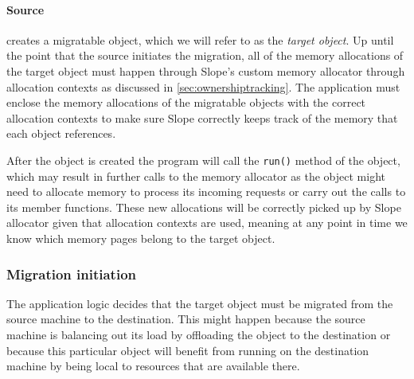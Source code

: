\paragraph{Source}
creates a migratable object, which we will refer to as the \emph{target object}.
Up until the point that
the source initiates the migration, all of the memory allocations of the target object
must happen through
Slope's custom memory allocator through allocation contexts as discussed in
\autoref{sec:ownershiptracking}.
The application must enclose the memory allocations of the migratable objects
with the correct allocation contexts to make sure Slope correctly keeps track of the
memory that each object references.



After the object is created the program will call the \texttt{run()} method
of the object, which may result in further calls to the memory allocator as
the object might need to allocate memory to process its incoming requests or
carry out the calls to its member functions. These new allocations will be
correctly picked up by Slope allocator given that allocation contexts are used,
meaning at any point in time we know which memory pages belong to the target object.

\subsubsection{Migration initiation}
The application logic decides that the target object must be migrated from the
source machine to the destination. This might happen because the source machine
is balancing out its load by offloading the object to the destination or because
this particular object will benefit from running on the destination machine
by being local to resources that are available there.

